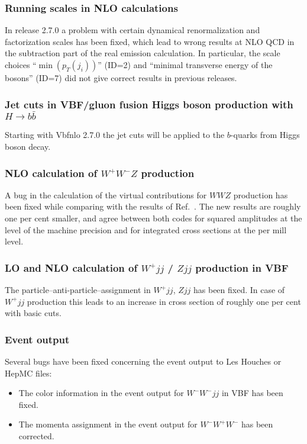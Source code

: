 \documentclass[english,12pt]{article}
\begin{document}
\subsubsection{Running scales in NLO calculations}

In release 2.7.0 a problem with certain dynamical renormalization and factorization
scales has been fixed, which lead to wrong results at NLO QCD in the subtraction part of the
real emission calculation. In particular, the scale choices ``$\min(p_T(j_i))$'' (ID=2)
and ``minimal transverse energy of the bosons'' (ID=7) did not give correct results
in previous releases.

          
\subsubsection{Jet cuts in VBF/gluon fusion Higgs boson production with $H\to b\bar{b}$}

Starting with {\sc Vbfnlo 2.7.0} the jet cuts will be applied to the
$b$-quarks from Higgs boson decay.


\subsubsection{NLO calculation of $W^+W^-Z$ production}

A bug in the calculation of the virtual contributions for $WWZ$
production has been fixed while comparing with the results of
Ref.~\cite{Nhung:2013jta}.  The new results are roughly one per cent
smaller, and agree between both codes for squared amplitudes at the
level of the machine precision and for integrated cross sections at the
per mill level.


\subsubsection{LO and NLO calculation of $W^+jj$ / $Zjj$ production in VBF}

The particle--anti-particle--assignment in $W^+jj$, $Zjj$ has been fixed.
In case of $W^+jj$ production this leads to an increase in cross section of roughly one per cent with basic cuts.


\subsubsection{Event output}

Several bugs have been fixed concerning the event output to Les Houches or HepMC files:
\begin{itemize}
 \item The color information in the event output for $W^-W^- jj$ in VBF has been fixed.
 \item The momenta assignment in the event output for $W^-W^+W^-$ has been corrected.
\end{itemize}
\end{document}
